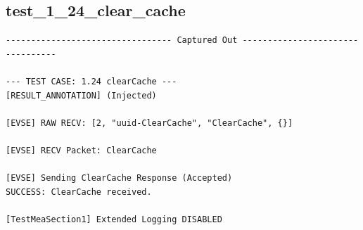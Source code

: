 \documentclass{article}
\begin{document}
\subsection*{test\_1\_24\_clear\_cache}
\begin{lstlisting}
--------------------------------- Captured Out ---------------------------------

--- TEST CASE: 1.24 clearCache ---
[RESULT_ANNOTATION] (Injected)

[EVSE] RAW RECV: [2, "uuid-ClearCache", "ClearCache", {}]

[EVSE] RECV Packet: ClearCache

[EVSE] Sending ClearCache Response (Accepted)
SUCCESS: ClearCache received.

[TestMeaSection1] Extended Logging DISABLED
\end{lstlisting}
\end{document}
